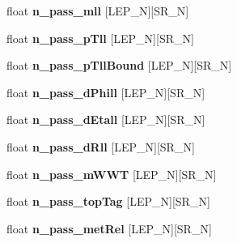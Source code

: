 \begin{DoxyCompactItemize}
\item 
\hypertarget{classSusySelection_a1c4a9ec111850fe4e1e7e6710c29baf7}{
float {\bfseries n\_\-pass\_\-mll} \mbox{[}LEP\_\-N\mbox{]}\mbox{[}SR\_\-N\mbox{]}}
\label{classSusySelection_a1c4a9ec111850fe4e1e7e6710c29baf7}

\item 
\hypertarget{classSusySelection_a19d5dc4267059fea9f8bebcfefc1c0d6}{
float {\bfseries n\_\-pass\_\-pTll} \mbox{[}LEP\_\-N\mbox{]}\mbox{[}SR\_\-N\mbox{]}}
\label{classSusySelection_a19d5dc4267059fea9f8bebcfefc1c0d6}

\item 
\hypertarget{classSusySelection_a75e9fac90bc236cd1bf799a560331e14}{
float {\bfseries n\_\-pass\_\-pTllBound} \mbox{[}LEP\_\-N\mbox{]}\mbox{[}SR\_\-N\mbox{]}}
\label{classSusySelection_a75e9fac90bc236cd1bf799a560331e14}

\item 
\hypertarget{classSusySelection_a35ecdc2468a7e5b24d2094696e99b1f0}{
float {\bfseries n\_\-pass\_\-dPhill} \mbox{[}LEP\_\-N\mbox{]}\mbox{[}SR\_\-N\mbox{]}}
\label{classSusySelection_a35ecdc2468a7e5b24d2094696e99b1f0}

\item 
\hypertarget{classSusySelection_a0cc22d1239c9144b03c8139932809ebb}{
float {\bfseries n\_\-pass\_\-dEtall} \mbox{[}LEP\_\-N\mbox{]}\mbox{[}SR\_\-N\mbox{]}}
\label{classSusySelection_a0cc22d1239c9144b03c8139932809ebb}

\item 
\hypertarget{classSusySelection_a5b63331291a9868094164b1f0ce91291}{
float {\bfseries n\_\-pass\_\-dRll} \mbox{[}LEP\_\-N\mbox{]}\mbox{[}SR\_\-N\mbox{]}}
\label{classSusySelection_a5b63331291a9868094164b1f0ce91291}

\item 
\hypertarget{classSusySelection_af08a03f4328efd87db392bdaadb57f53}{
float {\bfseries n\_\-pass\_\-mWWT} \mbox{[}LEP\_\-N\mbox{]}\mbox{[}SR\_\-N\mbox{]}}
\label{classSusySelection_af08a03f4328efd87db392bdaadb57f53}

\item 
\hypertarget{classSusySelection_abf3d96c3046372909bbe53d012e774bc}{
float {\bfseries n\_\-pass\_\-topTag} \mbox{[}LEP\_\-N\mbox{]}\mbox{[}SR\_\-N\mbox{]}}
\label{classSusySelection_abf3d96c3046372909bbe53d012e774bc}

\item 
\hypertarget{classSusySelection_a7fe4f2bd23391d64ca1e7a332654dd74}{
float {\bfseries n\_\-pass\_\-metRel} \mbox{[}LEP\_\-N\mbox{]}\mbox{[}SR\_\-N\mbox{]}}
\label{classSusySelection_a7fe4f2bd23391d64ca1e7a332654dd74}


\end{DoxyCompactItemize}
